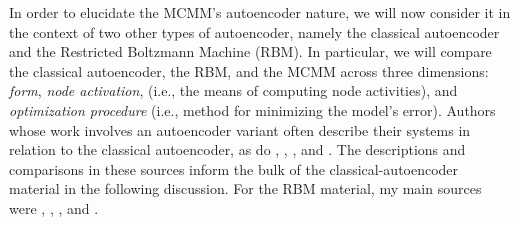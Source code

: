In order to elucidate the MCMM's autoencoder nature, we will now consider it in the context
of two other types of autoencoder, namely the classical autoencoder and the Restricted Boltzmann Machine (RBM).
In particular, we will compare the classical autoencoder, the RBM, and the MCMM across three dimensions: \emph{form}, \emph{node activation}, 
(i.e., the means of computing node activities), and \emph{optimization procedure}
(i.e., method for minimizing the model's error). 
Authors whose work involves an autoencoder variant often describe their systems in relation to 
the classical autoencoder, as do \citet{vincent:2010}, \citet{vincent:2011}, \citet{baldi:2012}, and \citet{chen-and-deng:2016}. 
The descriptions and comparisons in these sources inform the bulk of the classical-autoencoder material in the following discussion. 
For the RBM material, my main sources were \citet{hinton-and-salak:2006}, \citet{hinton:2012}, \citet{cueto-et-al:2009},  and \citet{fischer:2014}.

